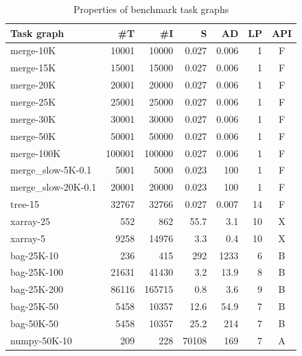 \setlength{\tabcolsep}{5pt}
\begin{table}
	\caption{Properties of \dask{} benchmark task graphs}
	\centering
	\label{tab:dask-graph-properties}
	\begin{tabular}{l|rrrrrc}
		\toprule
		\textbf{Task graph} & \textbf{\#T} & \textbf{\#I} & \textbf{S} &
		\textbf{AD}         & \textbf{LP}  & \textbf{API}                               \\
		\midrule
		merge-10K           & 10001        & 10000        & 0.027      & 0.006 & 1  & F \\
		merge-15K           & 15001        & 15000        & 0.027      & 0.006 & 1  & F \\
		merge-20K           & 20001        & 20000        & 0.027      & 0.006 & 1  & F \\
		merge-25K           & 25001        & 25000        & 0.027      & 0.006 & 1  & F \\
		merge-30K           & 30001        & 30000        & 0.027      & 0.006 & 1  & F \\
		merge-50K           & 50001        & 50000        & 0.027      & 0.006 & 1  & F \\
		merge-100K          & 100001       & 100000       & 0.027      & 0.006 & 1  & F \\
		merge\_slow-5K-0.1  & 5001         & 5000         & 0.023      & 100   & 1  & F \\
		merge\_slow-20K-0.1 & 20001        & 20000        & 0.023      & 100   & 1  & F \\
		tree-15             & 32767        & 32766        & 0.027      & 0.007 & 14 & F \\
		xarray-25           & 552          & 862          & 55.7       & 3.1   & 10 & X \\
		xarray-5            & 9258         & 14976        & 3.3        & 0.4   & 10 & X \\
		bag-25K-10          & 236          & 415          & 292        & 1233  & 6  & B \\
		bag-25K-100         & 21631        & 41430        & 3.2        & 13.9  & 8  & B \\
		bag-25K-200         & 86116        & 165715       & 0.8        & 3.6   & 9  & B \\
		bag-25K-50          & 5458         & 10357        & 12.6       & 54.9  & 7  & B \\
		bag-50K-50          & 5458         & 10357        & 25.2       & 214   & 7  & B \\
		numpy-50K-10        & 209          & 228          & 70108      & 169   & 7  & A \\

\end{tabular}
\end{table}
